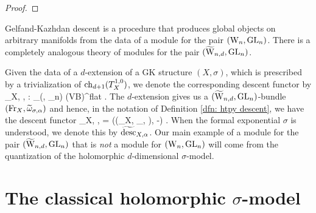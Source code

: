 \begin{proof}
\end{proof}

Gelfand-Kazhdan descent is a procedure that produces global objects on arbitrary manifolds from the data of a module for the pair $({{\rm W}_n}, {\rm GL}_n)$. 
There is a completely analogous theory of modules for the pair $(\widetilde{\rm W}_{n,d}, {\rm GL}_n)$. 

Given the data of a $d$-extension of a GK structure $(X, \sigma)$, which is prescribed by a trivialization of ${\rm ch}_{d+1}(T_X^{1,0})$, we denote the corresponding descent functor by
\ben
\Tilde{\desc}_{X, \sigma, \alpha} : \Mod_{(\TVectd, \GL_n)} (VB)^{flat} .
\een
The $d$-extension gives us a $(\widetilde{\rm W}_{n,d},{\rm GL}_n)$-bundle $({\rm Fr}_X, \widetilde{\omega}_{\sigma,\alpha})$ and hence, in the notation of Definition \ref{dfn: htpy descent}, we have the descent functor
\ben
\Tilde{\desc}_{X, \sigma, \alpha} = \desc((\Fr_X, \Tilde{\omega}_{\sigma, \alpha}), -) .
\een
When the formal exponential $\sigma$ is understood, we denote this by $\widetilde{{\rm desc}}_{X,\alpha}$. 
Our main example of a module for the pair $(\widetilde{\rm W}_{n,d}, {\rm GL}_n)$ that is {\em not} a module for $({{\rm W}_n}, {\rm GL}_n)$ will come from the quantization of the holomorphic $d$-dimensional $\sigma$-model.

\section{The classical holomorphic $\sigma$-model}

